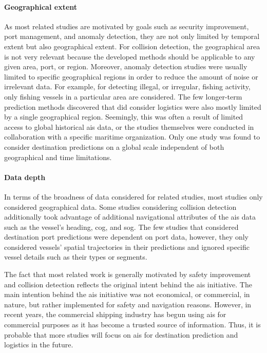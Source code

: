 \paragraph{Geographical extent}
As most related studies are motivated by goals such as security improvement, port management, and anomaly detection, they are not only limited by temporal extent but also geographical extent. For collision detection, the geographical area is not very relevant because the developed methods should be applicable to any given area, port, or region. Moreover, anomaly detection studies were usually limited to specific geographical regions in order to reduce the amount of noise or irrelevant data. For example, for detecting illegal, or irregular, fishing activity, only fishing vessels in a particular area are considered. The few longer-term prediction methods discovered that did consider logistics were also mostly limited by a single geographical region. Seemingly, this was often a result of limited access to global historical \acrshort{ais} data, or the studies themselves were conducted in collaboration with a specific maritime organization. Only one study was found to consider destination predictions on a global scale independent of both geographical and time limitations.

\paragraph{Data depth}
In terms of the broadness of data considered for related studies, most studies only considered geographical data. Some studies considering collision detection additionally took advantage of additional navigational attributes of the \acrshort{ais} data such as the vessel's heading, \acrfull{cog}, and \acrfull{sog}. The few studies that considered destination port predictions were dependent on port data, however, they only considered vessels' spatial trajectories in their predictions and ignored specific vessel details such as their types or segments.

The fact that most related work is generally motivated by safety improvement and collision detection reflects the original intent behind the \acrshort{ais} initiative. The main intention behind the \acrshort{ais} initiative was not economical, or commercial, in nature, but rather implemented for safety and navigation reasons. However, in recent years, the commercial shipping industry has begun using \acrshort{ais} for commercial purposes as it has become a trusted source of information. Thus, it is probable that more studies will focus on \acrshort{ais} for destination prediction and logistics in the future.

